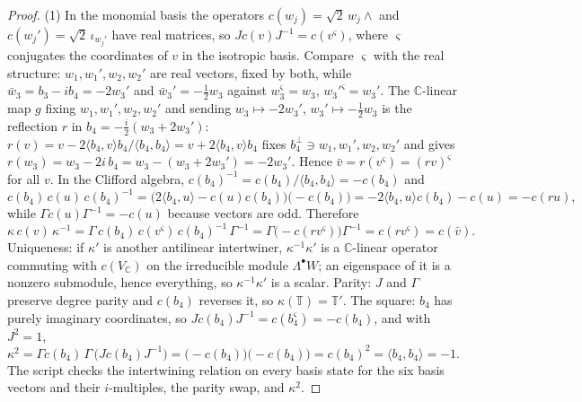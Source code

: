 \documentclass[11pt]{article}
\theoremstyle{definition}
\newcommand{\C}{\mathbb{C}}
\newcommand{\T}{\mathbb{T}}
\newcommand{\ip}[2]{\langle #1, #2\rangle}
\begin{document}
\begin{proof}
(1) In the monomial basis the operators $c(w_j) = \sqrt2\,w_j\wedge$ and $c(w_j') = \sqrt2\,\iota_{w_j'}$ have real matrices, so $J c(v) J^{-1} = c(v^\varsigma)$, where $\varsigma$ conjugates the coordinates of $v$ in the isotropic basis. Compare $\varsigma$ with the real structure: $w_1, w_1', w_2, w_2'$ are real vectors, fixed by both, while $\bar w_3 = b_3 - ib_4 = -2w_3'$ and $\bar w_3' = -\tfrac12 w_3$ against $w_3^\varsigma = w_3$, $w_3'^\varsigma = w_3'$. The $\C$-linear map $g$ fixing $w_1, w_1', w_2, w_2'$ and sending $w_3 \mapsto -2w_3'$, $w_3' \mapsto -\tfrac12 w_3$ is the reflection $r$ in $b_4 = -\tfrac{i}{2}(w_3 + 2w_3')$: $r(v) = v - 2\ip{b_4}{v}b_4/\ip{b_4}{b_4} = v + 2\ip{b_4}{v}b_4$ fixes $b_4^\perp \ni w_1, w_1', w_2, w_2'$ and gives $r(w_3) = w_3 - 2i\,b_4 = w_3 - (w_3 + 2w_3') = -2w_3'$. Hence $\bar v = r(v^\varsigma) = (rv)^\varsigma$ for all $v$. In the Clifford algebra, $c(b_4)^{-1} = c(b_4)/\ip{b_4}{b_4} = -c(b_4)$ and
\[
c(b_4)\,c(u)\,c(b_4)^{-1} = \bigl(2\ip{b_4}{u} - c(u)c(b_4)\bigr)\bigl(-c(b_4)\bigr) = -2\ip{b_4}{u}c(b_4) - c(u) = -c(ru),
\]
while $\Gamma c(u)\Gamma^{-1} = -c(u)$ because vectors are odd. Therefore
\[
\kappa\,c(v)\,\kappa^{-1} = \Gamma\,c(b_4)\,c(v^\varsigma)\,c(b_4)^{-1}\,\Gamma^{-1} = \Gamma\bigl(-c(r v^\varsigma)\bigr)\Gamma^{-1} = c(r v^\varsigma) = c(\bar v).
\]
Uniqueness: if $\kappa'$ is another antilinear intertwiner, $\kappa^{-1}\kappa'$ is a $\C$-linear operator commuting with $c(V_\C)$ on the irreducible module $\Lambda^\bullet W$; an eigenspace of it is a nonzero submodule, hence everything, so $\kappa^{-1}\kappa'$ is a scalar. Parity: $J$ and $\Gamma$ preserve degree parity and $c(b_4)$ reverses it, so $\kappa(\T) = \T'$. The square: $b_4$ has purely imaginary coordinates, so $J c(b_4) J^{-1} = c(b_4^\varsigma) = -c(b_4)$, and with $J^2 = 1$,
\[
\kappa^2 = \Gamma c(b_4)\,\Gamma\,\bigl(J c(b_4) J^{-1}\bigr) = \bigl(-c(b_4)\bigr)\bigl(-c(b_4)\bigr) = c(b_4)^2 = \ip{b_4}{b_4} = -1 .
\]
The script checks the intertwining relation on every basis state for the six basis vectors and their $i$-multiples, the parity swap, and $\kappa^2$.


\end{proof}
\end{document}
